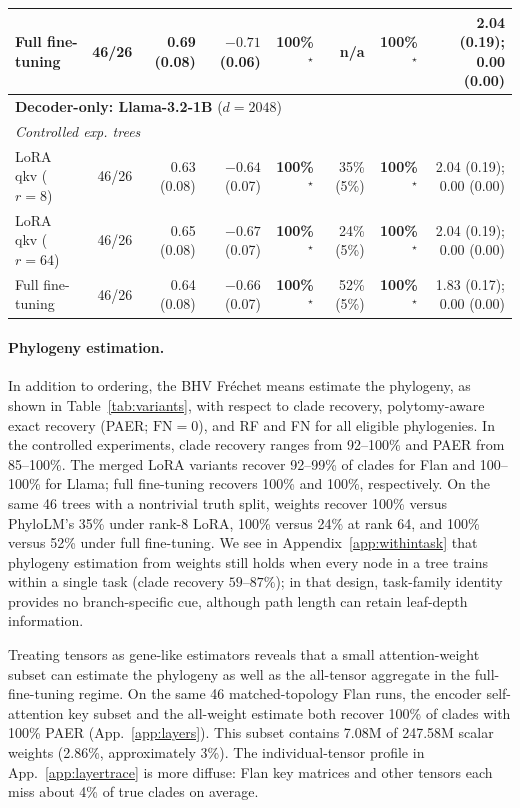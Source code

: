 \documentclass{article}
\theoremstyle{definition}
\theoremstyle{plain}
\begin{document}
\begin{table}[h]
\begin{center}
{\begin{tabular}{lrrrrrrr}
\quad Full fine-tuning                  & 46/26 & 0.69 (0.08) & $-0.71$ (0.06) & \textbf{100\%}$^\star$ & n/a & \textbf{100\%}$^\star$ & 2.04 (0.19); 0.00 (0.00) \\
\midrule
\multicolumn{8}{l}{\textbf{Decoder-only: Llama-3.2-1B} ($d=2048$)} \\
\multicolumn{8}{l}{\quad\textit{Controlled exp. trees}} \\
\quad LoRA qkv ($r{=}8$)                 & 46/26 & 0.63 (0.08) & $-0.64$ (0.07) & \textbf{100\%}$^\star$ & 35\% (5\%) & \textbf{100\%}$^\star$ & 2.04 (0.19); 0.00 (0.00) \\
\quad LoRA qkv ($r{=}64$)                & 46/26 & 0.65 (0.08) & $-0.67$ (0.07) & \textbf{100\%}$^\star$ & 24\% (5\%) & \textbf{100\%}$^\star$ & 2.04 (0.19); 0.00 (0.00) \\
\quad Full fine-tuning                   & 46/26 & 0.64 (0.08) & $-0.66$ (0.07) & \textbf{100\%}$^\star$ & 52\% (5\%) & \textbf{100\%}$^\star$ & 1.83 (0.17); 0.00 (0.00) \\
\bottomrule
\end{tabular}
}
\end{center}
\end{table}



\paragraph{Phylogeny estimation.}
\label{sec:results:weighttree}
In addition to ordering, the BHV Fr\'echet means estimate the phylogeny, as shown in Table~\ref{tab:variants}, with respect to clade recovery, polytomy-aware exact recovery (PAER; $\mathrm{FN}=0$), and RF and FN for all eligible phylogenies. In the controlled experiments, clade recovery ranges from 92--100\% and PAER from 85--100\%. The merged LoRA variants recover 92--99\% of clades for Flan and 100--100\% for Llama; full fine-tuning recovers 100\% and 100\%, respectively. On the same 46 trees with a nontrivial truth split, weights recover 100\% versus PhyloLM's 35\% under rank-8 LoRA, 100\% versus 24\% at rank 64, and 100\% versus 52\% under full fine-tuning. We see in Appendix~\ref{app:withintask} that phylogeny estimation from weights still holds when every node in a tree trains within a single task (clade recovery $59$--$87\%$); in that design, task-family identity provides no branch-specific cue, although path length can retain leaf-depth information.

Treating tensors as gene-like estimators reveals that a small attention-weight subset can estimate the phylogeny as well as the all-tensor aggregate in the full-fine-tuning regime. On the same 46 matched-topology Flan runs, the encoder self-attention key subset and the all-weight estimate both recover 100\% of clades with 100\% PAER (App.~\ref{app:layers}). This subset contains 7.08M of 247.58M scalar weights (2.86\%, approximately 3\%). The individual-tensor profile in App.~\ref{app:layertrace} is more diffuse: Flan key matrices and other tensors each miss about 4\% of true clades on average.
\end{document}
